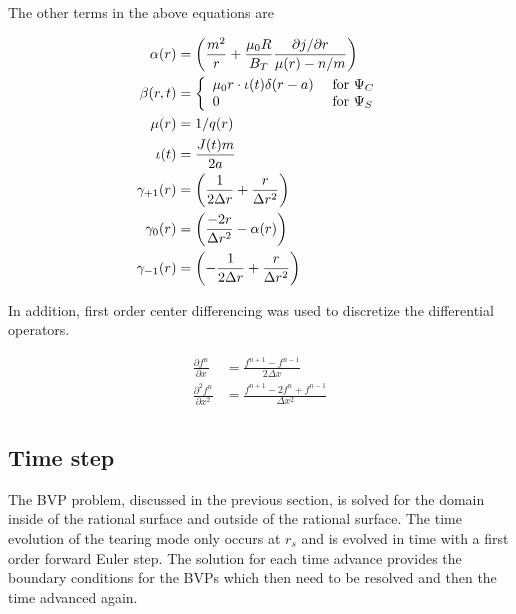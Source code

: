 \documentclass{article}
\begin{document}
The other terms in the above equations are

\begin{equation} \label{eq:BVPTerms}
\begin{split}
\alpha(r)&=\left( \frac{m^2}{r} +\frac{\mu_0 R}{B_T} \frac{\partial j / \partial r}{\mu(r)-n/m} \right) \\
    \beta(r,t) &= \left\{
    \begin{array}{l l}
    \mu_0r \cdot \iota(t) \delta (r-a) & \text{ for } \Psi_C \\
    0 & \text{ for } \Psi_S\\
    \end{array} \right. \\
\mu(r)&=1/q(r)\\
\iota(t) &= \frac{J(t)m}{2a} \\
  \gamma_{+1}(r) &=\left(\frac{1}{2 \Delta r}+\frac{r}{\Delta r^2 }\right) \\
  \gamma_{0}(r)& = \left( \frac{-2r}{\Delta r^2} -\alpha(r) \right)\\
  \gamma_{-1}(r)& = \left(-\frac{1}{2\Delta r} + \frac{r}{\Delta r^2} \right)
\end{split}
\end{equation}

In addition, first order center differencing was used to discretize the differential operators.  

\begin{equation} \label{eq3}
\begin{split}
 \frac{\partial f^n}{\partial x} & = \frac{f^{n+1}-f^{n-1}}{2\Delta x} \\
 \frac{\partial^2 f^n}{\partial x^2} & = \frac{f^{n+1}-2f^n+f^{n-1}}{\Delta x^2} \\
\end{split} 
\end{equation} 


\subsection{Time step}

The BVP problem, discussed in the previous section, is solved for the domain inside of the rational surface and outside of the rational surface.  The time evolution of the tearing mode only occurs at $r_s$ and is evolved in time with a first order forward Euler step.  The solution for each time advance provides the boundary conditions for the BVPs which then need to be resolved and then the time advanced again.  
\end{document}
